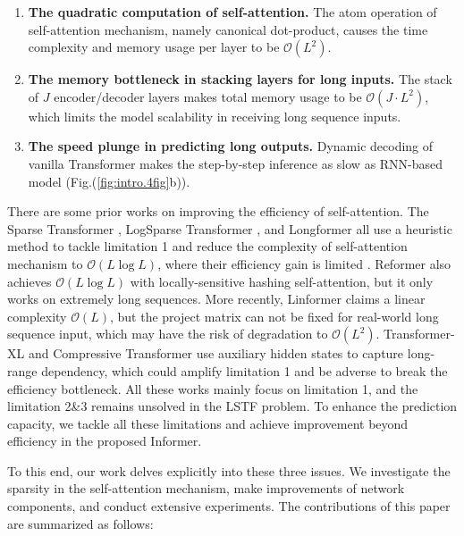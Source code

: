 \documentclass[letterpaper]{article} %
\newcommand{\bigO}{\mathcal{O}}
\newcommand{\mn}{Informer}
\begin{document}
\begin{enumerate}[nosep, leftmargin=0.45cm]
    \item \textbf{The quadratic computation of self-attention.} The atom operation of self-attention mechanism, namely canonical dot-product, causes the time complexity and memory usage per layer to be $\bigO(L^2)$. 
    \item \textbf{The memory bottleneck in stacking layers for long inputs.} The stack of $J$ encoder/decoder layers makes total memory usage to be $\bigO(J \cdot L^2)$, which limits the model scalability in receiving long sequence inputs.
    \item \textbf{The speed plunge in predicting long outputs.} Dynamic decoding of vanilla Transformer makes the step-by-step inference as slow as RNN-based model (Fig.(\ref{fig:intro.4fig}b)).
\end{enumerate}
There are some prior works on improving the efficiency of self-attention. The Sparse Transformer \cite{child2019generating}, LogSparse Transformer \cite{li2019enhancing}, and Longformer \cite{DBLP:journals/corr/abs-2004-05150} all use a heuristic method to tackle limitation 1 and reduce the complexity of self-attention mechanism to $\bigO(L \log L)$, where their efficiency gain is limited \cite{qiu2019blockwise}. Reformer \cite{kitaev2019reformer} also achieves $\bigO(L \log L)$ with locally-sensitive hashing self-attention, but it only works on extremely long sequences. More recently, Linformer \cite{wang2020linformer} claims a linear complexity $\bigO(L)$, but the project matrix can not be fixed for real-world long sequence input, which may have the risk of degradation to $\bigO(L^2)$. Transformer-XL \cite{dai2019transformer} and Compressive Transformer \cite{rae2019compressive} use auxiliary hidden states to capture long-range dependency, which could amplify limitation 1 and be adverse to break the efficiency bottleneck. All these works mainly focus on limitation 1, and the limitation 2\&3 remains unsolved in the LSTF problem. To enhance the prediction capacity, we tackle all these limitations and achieve improvement beyond efficiency in the proposed \mn.

To this end, our work delves explicitly into these three issues.  We investigate the sparsity in the self-attention mechanism, make improvements of network components, and conduct extensive experiments.
The contributions of this paper are summarized as follows:
\end{document}
